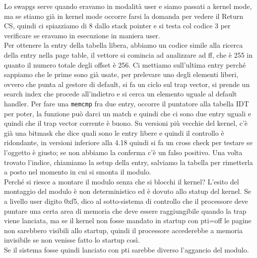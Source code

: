 \documentclass[12pt, oneside]{extbook}
\begin{document}
Lo swapgs serve quando eravamo in modalità user e siamo passati a  kernel mode, ma se stiamo già in kernel mode occorre farsi la domanda per vedere il Return CS, quindi ci spiazziamo di 8 dallo stack pointer e si testa col codice 3 per verificare se eravamo in esecuzione in maniera user.\\Per ottenere la entry della tabella libera, abbiamo un codice simile alla ricerca della entry nella page table, il vettore si comincia ad analizzare ad ff, che è 255 in quanto il numero totale degli offset è 256. Ci mettiamo sull'ultima entry perché sappiamo che le prime sono già usate, per prelevare uno degli elementi liberi, ovvero che punta al gestore di default, si fa un ciclo sul trap vector, si prende un search index che procede all'indietro e si cerca un elemento uguale al default handler. Per fare una \texttt{memcmp} fra due entry, occorre il puntatore alla tabella IDT per poter, la funzione può darci un match e quindi che ci sono due entry uguali e quindi che il trap vector corrente è buono. Su versioni più vecchie del kernel, c'è già una bitmask che dice quali sono le entry libere e quindi il controllo è ridondante, in versioni inferiore alla 4.18 quindi si fa un cross check per testare se l'oggetto è giusto; se non abbiamo la conferma c'è un falso positivo. Una volta trovato l'indice, chiamiamo la setup della entry, salviamo la tabella per rimetterla a posto nel momento in cui si smonta il modulo.\\Perché si riesce a montare il modulo senza che si blocchi il kernel? L'esito del montaggio del modulo è non deterministico ed è dovuto allo statup del kernel. Se a livello user digito 0xf5, dico al sotto-sistema di controllo che il processore deve puntare una certa area di memoria che deve essere raggiungibile quando la trap viene lanciata, ma se il kernel non fosse mandato in startup con pti=off le pagine non sarebbero visibili allo startup, quindi il processore accederebbe a memoria invisibile se non venisse fatto lo startup così.\\Se il sistema fosse quindi lanciato con pti sarebbe diverso l'aggancio del modulo.
\end{document}
